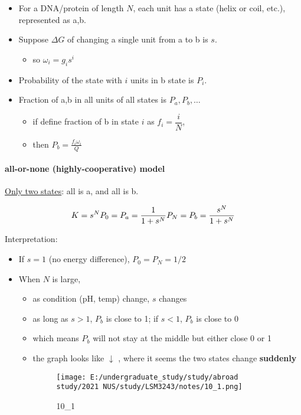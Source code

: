 \documentclass[]{article}
\let\oldparagraph\paragraph
\renewcommand{\paragraph}[1]{\oldparagraph{#1}\mbox{}}
\begin{document}
\begin{itemize}
\item
  For a DNA/protein of length \(N\), each unit has a state (helix or
  coil, etc.), represented as a,b. 
\item
  Suppose \(\Delta G\) of changing a single unit from a to b is \(s\).

  \begin{itemize}
  \item
    so \(\omega_i=g_is^i\)
  \end{itemize}
\item
  Probability of the state with \(i\) units in b state is \(P_i\).
\item
  Fraction of a,b in all units of all states is \(P_a,P_b,\dots\)

  \begin{itemize}
  \item
    if define fraction of b in state \(i\) as \(f_i=\dfrac{i}{N}\),
  \item
    then \(P_b=\frac{f_i\omega_i}{Q}\)
  \end{itemize}
\end{itemize}

\hypertarget{all-or-none-highly-cooperative-model}{%
\paragraph{all-or-none (highly-cooperative)
model}\label{all-or-none-highly-cooperative-model}}

\underline{Only two states}: all is a, and all is b.

\[K=s^N\\
P_0=P_a=\dfrac{1}{1+s^N}\\
P_N=P_b=\dfrac{s^N}{1+s^N}\\\]

Interpretation:

\begin{itemize}
\item
  If \(s=1\) (no energy difference), \(P_0=P_N=1/2\)
\item
  When \(N\) is large,

  \begin{itemize}
  \item
    as condition (pH, temp) change, \(s\) changes
  \item
    as long as \(s>1\), \(P_b\) is close to 1; if \(s<1\), \(P_b\) is
    close to 0
  \item
    which means \(P_b\) will not stay at the middle but either close 0
    or 1
  \item
    the graph looks like \(\downarrow\) , where it seems the two states
    change \textbf{suddenly}

    \begin{figure}
    \centering
    \texttt{[image: E:/undergraduate\_study/study/abroad study/2021 NUS/study/LSM3243/notes/10\_1.png]}
    \caption{10\_1}
    \end{figure}
  \end{itemize}
\end{itemize}
\end{document}
